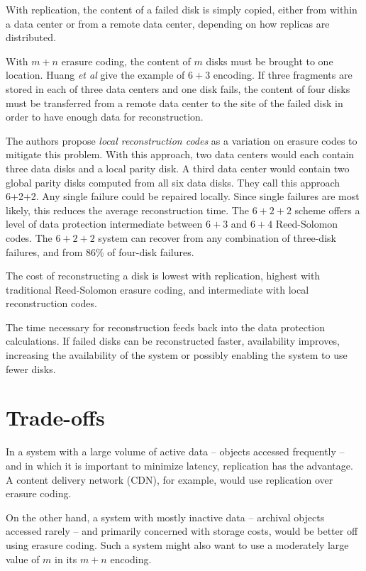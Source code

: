 \documentclass[11pt]{article}
\begin{document}
With replication, the content of a failed disk is simply copied, either from within a data center or from a remote data center, depending on how replicas are distributed.

With $m+n$ erasure coding, the content of $m$ disks must be brought to one location. Huang \emph{et al} \cite{lrc} give the example of $6+3$ encoding. If three fragments are stored in each of three data centers and one disk fails, the content of four disks must be transferred from a remote data center to the site of the failed disk in order to have enough data for reconstruction. 

The authors propose \emph{local reconstruction codes} \cite{lrc} as a variation on erasure codes to mitigate this problem. With this approach, two data centers would each contain three data disks and a local parity disk. A third data center would contain two global parity disks computed from all six data disks. They call this approach 6+2+2. Any single failure could be repaired locally. Since single failures are most likely, this reduces the average reconstruction time. The $6+2+2$ scheme offers a level of data protection intermediate between $6+3$ and $6+4$ Reed-Solomon codes. The $6+2+2$ system can recover from any combination of three-disk failures, and from 86\% of four-disk failures.

The cost of reconstructing a disk is lowest with replication, highest with traditional Reed-Solomon erasure coding, and intermediate with local reconstruction codes.

The time necessary for reconstruction feeds back into the data protection calculations. If failed disks can be reconstructed faster, availability improves, increasing the availability of the system or possibly enabling the system to use fewer disks.


\section{Trade-offs}

In a system with a large volume of active data -- objects accessed frequently -- and in which it is important to minimize latency, replication has the advantage. A content delivery network (CDN), for example, would use replication over erasure coding. 

On the other hand, a system with mostly inactive data -- archival objects accessed rarely -- and primarily concerned with storage costs, would be better off using erasure coding. Such a system might also want to use a moderately large value of $m$ in its $m+n$ encoding.
\end{document}

